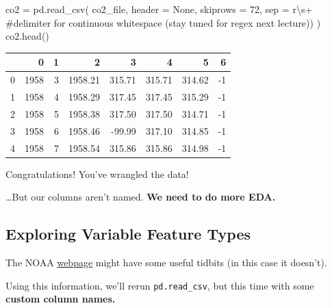 \documentclass[
  letterpaper,
  DIV=11,
  numbers=noendperiod]{scrreprt}
\newenvironment{Shaded}{\begin{snugshade}}{\end{snugshade}}
\newcommand{\CommentTok}[1]{\textcolor[rgb]{0.37,0.37,0.37}{#1}}
\newcommand{\DecValTok}[1]{\textcolor[rgb]{0.68,0.00,0.00}{#1}}
\newcommand{\NormalTok}[1]{\textcolor[rgb]{0.00,0.23,0.31}{#1}}
\newcommand{\OperatorTok}[1]{\textcolor[rgb]{0.37,0.37,0.37}{#1}}
\newcommand{\VariableTok}[1]{\textcolor[rgb]{0.07,0.07,0.07}{#1}}
\newcommand{\VerbatimStringTok}[1]{\textcolor[rgb]{0.13,0.47,0.30}{#1}}
\begin{document}
\begin{Shaded}
\begin{Highlighting}[]
\NormalTok{co2 }\OperatorTok{=}\NormalTok{ pd.read\_csv(}
\NormalTok{    co2\_file, header }\OperatorTok{=} \VariableTok{None}\NormalTok{, skiprows }\OperatorTok{=} \DecValTok{72}\NormalTok{,}
\NormalTok{    sep }\OperatorTok{=} \VerbatimStringTok{r\textquotesingle{}\textbackslash{}s+\textquotesingle{}}       \CommentTok{\#delimiter for continuous whitespace (stay tuned for regex next lecture))}
\NormalTok{)}
\NormalTok{co2.head()}
\end{Highlighting}
\end{Shaded}

\begin{tabular}{lrrrrrrr}
\toprule
{} &     0 &  1 &       2 &      3 &      4 &      5 &  6 \\
\midrule
0 &  1958 &  3 & 1958.21 & 315.71 & 315.71 & 314.62 & -1 \\
1 &  1958 &  4 & 1958.29 & 317.45 & 317.45 & 315.29 & -1 \\
2 &  1958 &  5 & 1958.38 & 317.50 & 317.50 & 314.71 & -1 \\
3 &  1958 &  6 & 1958.46 & -99.99 & 317.10 & 314.85 & -1 \\
4 &  1958 &  7 & 1958.54 & 315.86 & 315.86 & 314.98 & -1 \\
\bottomrule
\end{tabular}

Congratulations! You've wrangled the data!

\ldots But our columns aren't named. \textbf{We need to do more EDA.}

\hypertarget{exploring-variable-feature-types}{%
\subsection{Exploring Variable Feature
Types}\label{exploring-variable-feature-types}}

The NOAA \href{https://gml.noaa.gov/ccgg/trends/}{webpage} might have
some useful tidbits (in this case it doesn't).

Using this information, we'll rerun \texttt{pd.read\_csv}, but this time
with some \textbf{custom column names.}
\end{document}
